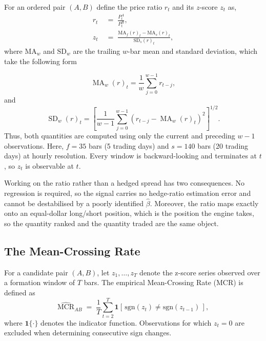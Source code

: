 \documentclass[11pt,a4paper]{article}
\theoremstyle{definition}
\newcommand{\MCR}{\ensuremath{\mathrm{MCR}}}
\begin{document}
For an ordered pair $(A,B)$ define the price ratio $r_t$ and its $z$-score $z_t$ as,
\begin{align}
  r_t &\;=\; \frac{P^A_t}{P^B_t}, \label{eq:ratio}\\[4pt]
  z_t &\;=\;
  \frac{\mathrm{MA}_f(r)_t - \mathrm{MA}_s(r)_t}{\mathrm{SD}_s(r)_t},
  \label{eq:z}
\end{align}
where $\mathrm{MA}_w$ and $\mathrm{SD}_w$ are the trailing $w$-bar mean and
standard deviation, which take the following form

\begin{equation}
    \operatorname{MA}_{w}(r)_t
    = \frac{1}{w}\sum_{j=0}^{w-1} r_{t-j},
    \label{eq:ma}
\end{equation}
and
\begin{equation}
    \operatorname{SD}_{w}(r)_t
    =
    \left[
    \frac{1}{w-1}
    \sum_{j=0}^{w-1}
    \left(r_{t-j}-\operatorname{MA}_{w}(r)_t\right)^2
    \right]^{1/2}.
    \label{eq:sd}
\end{equation}
Thus, both quantities are computed using only the current and preceding
$w-1$ observations. Here, $f = 35$ bars (5 trading days) and $s = 140$ bars (20
trading days) at hourly resolution. Every window is backward-looking and
terminates at $t$, so $z_t$ is observable at $t$.

Working on the ratio rather than a hedged spread has two consequences. No
regression is required, so the signal carries no hedge-ratio estimation error
and cannot be destabilised by a poorly identified $\hat{\beta}$. Moreover, the ratio
maps exactly onto an equal-dollar long/short position, which is the position the
engine takes, so the quantity ranked and the quantity traded are the same
object.

\subsection{The Mean-Crossing Rate}

For a candidate pair $(A,B)$, let $z_1,\ldots,z_T$ denote the z-score
series observed over a formation window of $T$ bars. The empirical
Mean-Crossing Rate (MCR) is defined as
\begin{equation}
  \widehat{\MCR}_{AB} \;=\; \frac{1}{T}
  \sum_{t=2}^{T}\mathbf{1}\!\left[\,\mathrm{sgn}(z_t)\neq\mathrm{sgn}(z_{t-1})\,\right],
  \label{eq:mcr}
\end{equation}
where $\mathbf{1}\{\cdot\}$ denotes the indicator function. Observations
for which $z_t=0$ are excluded when determining consecutive sign changes.
\end{document}
